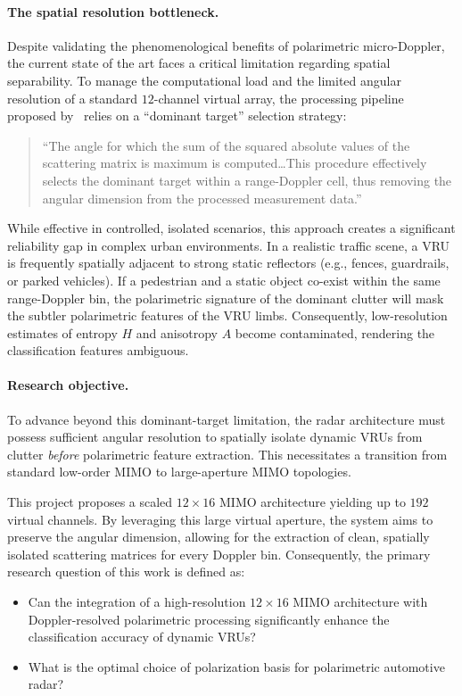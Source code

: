 \paragraph{The spatial resolution bottleneck.}
Despite validating the phenomenological benefits of polarimetric micro-Doppler, the current state of the art faces a critical limitation regarding spatial separability.
To manage the computational load and the limited angular resolution of a standard $12$-channel virtual array, the processing pipeline proposed by~\textcite{bouwmeesterClassificationDynamicVulnerable2025} relies on a \enquote{dominant target} selection strategy:
\begin{quote}
    \enquote{The angle for which the sum of the squared absolute values of the scattering matrix is maximum is computed\dots This procedure effectively selects the dominant target within a range-Doppler cell, thus removing the angular dimension from the processed measurement data.}
\end{quote}

While effective in controlled, isolated scenarios, this approach creates a significant reliability gap in complex urban environments.
In a realistic traffic scene, a VRU is frequently spatially adjacent to strong static reflectors (e.g., fences, guardrails, or parked vehicles).
If a pedestrian and a static object co-exist within the same range-Doppler bin, the polarimetric signature of the dominant clutter will mask the subtler polarimetric features of the VRU limbs.
Consequently, low-resolution estimates of entropy $H$ and anisotropy $A$ become contaminated, rendering the classification features ambiguous.

\paragraph{Research objective.}
To advance beyond this dominant-target limitation, the radar architecture must possess sufficient angular resolution to spatially isolate dynamic VRUs from clutter \emph{before} polarimetric feature extraction.
This necessitates a transition from standard low-order MIMO to large-aperture MIMO topologies.

This project proposes a scaled $12 \times 16$ MIMO architecture yielding up to $192$ virtual channels.
By leveraging this large virtual aperture, the system aims to preserve the angular dimension, allowing for the extraction of clean, spatially isolated scattering matrices for every Doppler bin.
Consequently, the primary research question of this work is defined as:
\begin{custombox}[orange]{}
    \begin{itemize}
        \item Can the integration of a high-resolution $12 \times 16$ MIMO architecture with Doppler-resolved polarimetric processing significantly enhance the classification accuracy of dynamic VRUs?
        \item What is the optimal choice of polarization basis for polarimetric automotive radar?
    \end{itemize}
\end{custombox}

